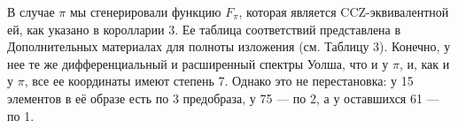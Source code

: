 В случае \(\pi\) мы сгенерировали функцию \(F_\pi\), которая является CCZ-эквивалентной ей, как указано в королларии 3. Ее таблица соответствий представлена в Дополнительных материалах для полноты изложения (см. Таблицу 3). Конечно, у нее те же дифференциальный и расширенный спектры Уолша, что и у \(\pi\), и, как и у \(\pi\), все ее координаты имеют степень 7. Однако это не перестановка: у 15 элементов в её образе есть по 3 предобраза, у 75 — по 2, а у оставшихся 61 — по 1.